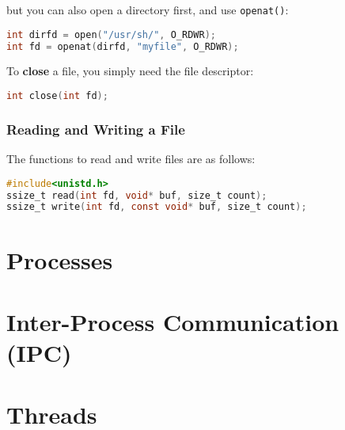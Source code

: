 \documentclass{article}
\newcommand{\bold}[1]{\textbf{#1}}
\newcommand{\code}[1]{\texttt{#1}}
\begin{document}
\noindent but you can also open a directory first, and use \code{openat()}:

\begin{lstlisting}[language=C]
int dirfd = open("/usr/sh/", O_RDWR);
int fd = openat(dirfd, "myfile", O_RDWR);
\end{lstlisting}

\noindent To \bold{close} a file, you simply need the file descriptor:

\begin{lstlisting}[language=C]
int close(int fd);
\end{lstlisting}

\subsubsection{Reading and Writing a File}

The functions to read and write files are as follows: 

\begin{lstlisting}[language=C]
#include<unistd.h>
ssize_t read(int fd, void* buf, size_t count);
ssize_t write(int fd, const void* buf, size_t count);
\end{lstlisting}



\newpage
\section{Processes}
\section{Inter-Process Communication (IPC)}
\section{Threads}
\end{document}
